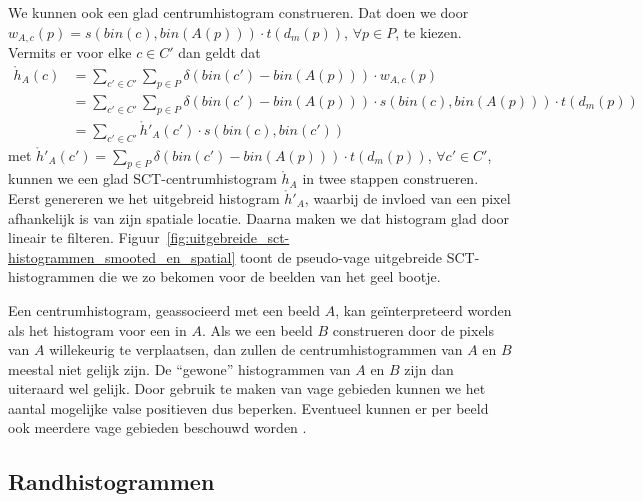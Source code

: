We kunnen ook een glad centrumhistogram construeren. Dat doen we door
$w_{A,c}(p)=s(bin(c),bin(A(p))) \cdot t(d_m(p))$, $\forall p \in P$, te kiezen. 
Vermits er voor elke $c \in C'$ dan geldt dat
\begin{align*}
\mathring{h}_A(c) 
 &= \displaystyle \sum_{c' \in C'} \sum_{p \in P} \delta (bin(c')-bin(A(p))) \cdot w_{A,c}(p) \\
 &= \displaystyle \sum_{c' \in C'} \sum_{p \in P} \delta (bin(c')-bin(A(p))) \cdot s(bin(c),bin(A(p))) \cdot t(d_m(p)) \\
 &= \displaystyle \sum_{c' \in C'} \mathring{h}'_A(c') \cdot s(bin(c),bin(c'))
\end{align*}
met $\mathring{h}'_A(c')=\sum_{p \in P} \delta (bin(c')-bin(A(p))) \cdot t(d_m(p))$, $\forall c' \in C'$, 
kunnen we een glad SCT-centrumhistogram $\mathring{h}_A$ in twee stappen construeren. Eerst
genereren we het uitgebreid histogram $\mathring{h}'_A$, waarbij de invloed van een pixel 
afhankelijk is van zijn spatiale locatie. Daarna maken we dat histogram glad door lineair te 
filteren. Figuur~\ref{fig:uitgebreide_sct-histogrammen_smooted_en_spatial} toont de
pseudo-vage uitgebreide SCT-histogrammen die we zo bekomen voor de beelden van het geel
bootje. 
 
Een centrumhistogram, geassocieerd met een beeld $A$, kan ge\"interpreteerd worden als het 
histogram voor een  in $A$. Als we een beeld $B$ construeren door de pixels
van $A$ willekeurig te verplaatsen, dan zullen de centrumhistogrammen van $A$ en $B$
meestal niet gelijk zijn. De ``gewone'' histogrammen van $A$ en $B$ zijn dan uiteraard wel gelijk. 
Door gebruik te maken van vage gebieden kunnen we het aantal mogelijke
valse positieven dus beperken. Eventueel kunnen er per beeld ook meerdere vage gebieden beschouwd
worden \cite{stricker:fuzzy_regions_for_image_indexing}.
 
\subsection{Randhistogrammen} 
 
